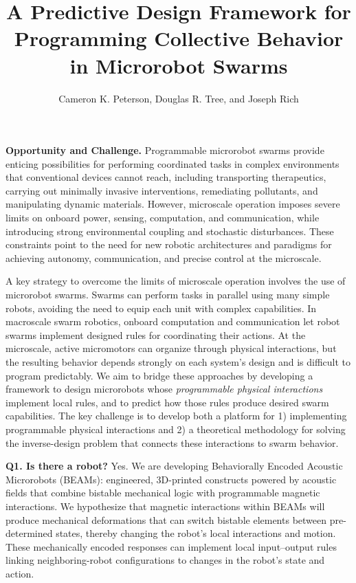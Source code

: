 \documentclass[11pt]{article}
\date{} %
\makeatletter
\renewcommand{\maketitle}{%
  \par\begingroup\centering
  {\Large\bfseries\@title\par}
  \vspace{0.35\baselineskip}
  {\normalsize\@author\par}
  \endgroup\vspace{0.6\baselineskip}}
\makeatother
\begin{document}
\title{A Predictive Design Framework for Programming Collective Behavior in Microrobot Swarms}
\author{Cameron K. Peterson, Douglas R. Tree, and Joseph Rich}

\maketitle
\thispagestyle{fancy}

\textbf{Opportunity and Challenge.}
Programmable microrobot swarms provide enticing possibilities for performing coordinated tasks in complex environments that conventional devices cannot reach, including transporting therapeutics, carrying out minimally invasive interventions, remediating pollutants, and manipulating dynamic materials.
However, microscale operation imposes severe limits on onboard power, sensing, computation, and communication, while introducing strong environmental coupling and stochastic disturbances.
These constraints point to the need for new robotic architectures and paradigms for achieving autonomy, communication, and precise control at the microscale.

A key strategy to overcome the limits of microscale operation involves the use of microrobot swarms.
Swarms can perform tasks in parallel using many simple robots, avoiding the need to equip each unit with complex capabilities.
In macroscale swarm robotics, onboard computation and communication let robot swarms implement designed rules for coordinating their actions.
At the microscale, active micromotors can organize through physical interactions, but the resulting behavior depends strongly on each system's design and is difficult to program predictably.
We aim to bridge these approaches by developing a framework to design microrobots whose \emph{programmable physical interactions} implement local rules, and to predict how those rules produce desired swarm capabilities.
The key challenge is to develop both a platform for 1) implementing programmable physical interactions and 2) a theoretical methodology for solving the inverse-design problem that connects these interactions to swarm behavior.

\textbf{Q1. Is there a robot?}
Yes. 
We are developing Behaviorally Encoded Acoustic Microrobots (BEAMs): engineered, 3D-printed constructs powered by acoustic fields that combine bistable mechanical logic with programmable magnetic interactions.
We hypothesize that magnetic interactions within BEAMs will produce mechanical deformations that can switch bistable elements between pre-determined states, thereby changing the robot's local interactions and motion.
These mechanically encoded responses can implement local input--output rules linking neighboring-robot configurations to changes in the robot's state and action.
\end{document}
